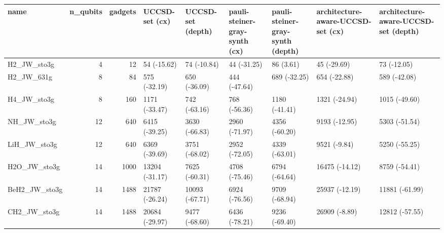 \begin{tabular}{lrrllllll}
\toprule
name & n\_qubits & gadgets & UCCSD-set (cx) & UCCSD-set (depth) & pauli-steiner-gray-synth (cx) & pauli-steiner-gray-synth (depth) & architecture-aware-UCCSD-set (cx) & architecture-aware-UCCSD-set (depth) \\
\midrule
H2\_JW\_sto3g & 4 & 12 & 54 (-15.62) & 74 (-10.84) & 44 (-31.25) & 86 (3.61) & 45 (-29.69) & 73 (-12.05) \\
H2\_JW\_631g & 8 & 84 & 575 (-32.19) & 650 (-36.09) & 444 (-47.64) & 689 (-32.25) & 654 (-22.88) & 589 (-42.08) \\
H4\_JW\_sto3g & 8 & 160 & 1171 (-33.47) & 742 (-63.16) & 768 (-56.36) & 1180 (-41.41) & 1321 (-24.94) & 1015 (-49.60) \\
NH\_JW\_sto3g & 12 & 640 & 6415 (-39.25) & 3630 (-66.83) & 2960 (-71.97) & 4356 (-60.20) & 9193 (-12.95) & 5303 (-51.54) \\
LiH\_JW\_sto3g & 12 & 640 & 6369 (-39.69) & 3751 (-68.02) & 2952 (-72.05) & 4339 (-63.01) & 9521 (-9.84) & 5250 (-55.25) \\
H2O\_JW\_sto3g & 14 & 1000 & 13204 (-31.17) & 7625 (-60.31) & 4708 (-75.46) & 6794 (-64.64) & 16475 (-14.12) & 8759 (-54.41) \\
BeH2\_JW\_sto3g & 14 & 1488 & 21787 (-26.24) & 10093 (-67.71) & 6924 (-76.56) & 9709 (-68.94) & 25937 (-12.19) & 11881 (-61.99) \\
CH2\_JW\_sto3g & 14 & 1488 & 20684 (-29.97) & 9477 (-68.60) & 6436 (-78.21) & 9236 (-69.40) & 26909 (-8.89) & 12812 (-57.55) \\
\bottomrule
\end{tabular}
